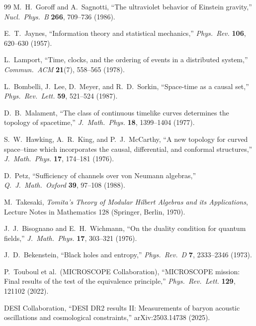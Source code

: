 \documentclass[12pt]{article}
\begin{document}
\begin{singlespace}
\begin{thebibliography}{99}
M.~H.~Goroff and A.~Sagnotti, ``The ultraviolet behavior of Einstein gravity,'' \emph{Nucl.\ Phys.\ B} \textbf{266}, 709--736 (1986).

E.~T.~Jaynes, ``Information theory and statistical mechanics,'' \emph{Phys.\ Rev.} \textbf{106}, 620--630 (1957).

L.~Lamport, ``Time, clocks, and the ordering of events in a distributed system,'' \emph{Commun.\ ACM} \textbf{21}(7), 558--565 (1978).

L.~Bombelli, J.~Lee, D.~Meyer, and R.~D.~Sorkin, ``Space-time as a causal set,'' \emph{Phys.\ Rev.\ Lett.} \textbf{59}, 521--524 (1987).

D.~B.~Malament, ``The class of continuous timelike curves determines the topology of spacetime,'' \emph{J.\ Math.\ Phys.} \textbf{18}, 1399--1404 (1977).

S.~W.~Hawking, A.~R.~King, and P.~J.~McCarthy, ``A new topology for curved space--time which incorporates the causal, differential, and conformal structures,'' \emph{J.\ Math.\ Phys.} \textbf{17}, 174--181 (1976).

D.~Petz, ``Sufficiency of channels over von Neumann algebras,'' \emph{Q.\ J.\ Math.\ Oxford} \textbf{39}, 97--108 (1988).

M.~Takesaki, \emph{Tomita's Theory of Modular Hilbert Algebras and its Applications}, Lecture Notes in Mathematics 128 (Springer, Berlin, 1970).

J.~J.~Bisognano and E.~H.~Wichmann, ``On the duality condition for quantum fields,'' \emph{J.\ Math.\ Phys.} \textbf{17}, 303--321 (1976).

J.~D.~Bekenstein, ``Black holes and entropy,'' \emph{Phys.\ Rev.\ D} \textbf{7}, 2333--2346 (1973).

P.~Touboul et al.\ (MICROSCOPE Collaboration), ``MICROSCOPE mission: Final results of the test of the equivalence principle,'' \emph{Phys.\ Rev.\ Lett.} \textbf{129}, 121102 (2022).

DESI Collaboration, ``DESI DR2 results II: Measurements of baryon acoustic oscillations and cosmological constraints,'' arXiv:2503.14738 (2025).

\end{thebibliography}
\end{singlespace}
\end{document}
